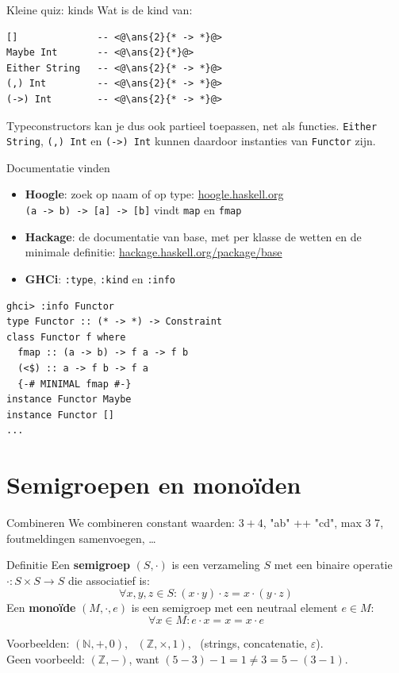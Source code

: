 \documentclass[aspectratio=169,11pt]{beamer}
\newcommand{\hs}{\lstinline[style=hsinline]}
\newcommand{\code}[1]{{\ttfamily\color{kuldonker}#1}}
\newcommand{\ans}[2]{\uncover<#1->{\color{codecomment}\itshape #2}}
\begin{document}
\begin{frame}[fragile]{Kleine quiz: kinds}
  Wat is de kind van:
\begin{lstlisting}
[]              -- <@\ans{2}{* -> *}@>
Maybe Int       -- <@\ans{2}{*}@>
Either String   -- <@\ans{2}{* -> *}@>
(,) Int         -- <@\ans{2}{* -> *}@>
(->) Int        -- <@\ans{2}{* -> *}@>
\end{lstlisting}
  \pause
  \pause
  Typeconstructors kan je dus ook \alert{partieel toepassen}, net als functies.
  \hs{Either String}, \hs{(,) Int} en \hs{(->) Int} kunnen daardoor
  instanties van \hs{Functor} zijn.
\end{frame}

\begin{frame}[fragile]{Documentatie vinden}
  \begin{itemize}
    \item \textbf{Hoogle}: zoek op naam \alert{of op type}:
      \href{https://hoogle.haskell.org}{\code{hoogle.haskell.org}}\\
      {\small \hs{(a -> b) -> [a] -> [b]} vindt \hs{map} en \hs{fmap}}
    \item \textbf{Hackage}: de documentatie van \code{base}, met per klasse
      de \alert{wetten} en de minimale definitie:
      \href{https://hackage.haskell.org/package/base}{\code{hackage.haskell.org/package/base}}
    \item \textbf{GHCi}: \hs{:type}, \hs{:kind} en \hs{:info}
  \end{itemize}
\begin{lstlisting}
ghci> :info Functor
type Functor :: (* -> *) -> Constraint
class Functor f where
  fmap :: (a -> b) -> f a -> f b
  (<$) :: a -> f b -> f a
  {-# MINIMAL fmap #-}
instance Functor Maybe
instance Functor []
...
\end{lstlisting}
\end{frame}



\section{Semigroepen en monoïden}

\begin{frame}{Combineren}
  We combineren constant waarden: $3 + 4$, \code{"ab" ++ "cd"},
  \code{max 3 7}, foutmeldingen samenvoegen, \dots
  \pause
  \begin{block}{Definitie}
    Een \textbf{semigroep} $(S, \cdot)$ is een verzameling $S$ met een binaire
    operatie $\cdot : S \times S \to S$ die \alert{associatief} is:
    \[ \forall x, y, z \in S : (x \cdot y) \cdot z = x \cdot (y \cdot z) \]
    Een \textbf{monoïde} $(M, \cdot, e)$ is een semigroep met een
    \alert{neutraal element} $e \in M$:
    \[ \forall x \in M : e \cdot x = x = x \cdot e \]
  \end{block}
  \pause
  Voorbeelden: $(\mathbb{N}, +, 0)$, \ $(\mathbb{Z}, \times, 1)$, \
  (strings, concatenatie, $\varepsilon$).\\
  Geen voorbeeld: $(\mathbb{Z}, -)$, want $(5 - 3) - 1 = 1 \neq 3 = 5 - (3 - 1)$.
\end{frame}
 
\end{document}
